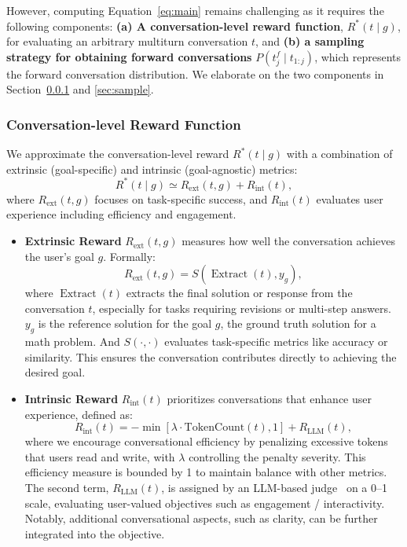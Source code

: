 However, computing Equation~\ref{eq:main} remains challenging as it requires the following components:
\textbf{(a) A conversation-level reward function}, $R^*(t \mid g)$, for evaluating an arbitrary multiturn conversation $t$, and  
\textbf{(b) a sampling strategy for obtaining forward conversations} $P(t_j^f \mid t_{1:j})$, which represents the forward conversation distribution.  We elaborate on the two components in Section~\ref{sec:conv} and \ref{sec:sample}.

\subsubsection{Conversation-level Reward Function}
\label{sec:conv}
We approximate the conversation-level reward $R^*(t \mid g)$ with a combination of extrinsic (goal-specific) and intrinsic (goal-agnostic) metrics:
\begin{equation}
R^*(t \mid g) \simeq R_{\text{ext}}(t, g) + R_{\text{int}}(t),
\end{equation}
where $R_{\text{ext}}(t, g)$ focuses on task-specific success, and $R_{\text{int}}(t)$ evaluates user experience including efficiency and engagement. 


\begin{itemize}
    \item \textbf{Extrinsic Reward} $R_{\text{ext}}(t, g)$ measures how well the conversation achieves the user’s goal $g$. Formally:
    \vspace{-2pt}
    \begin{equation}
        R_{\text{ext}}(t, g) = S(\operatorname{Extract}(t), y_g),
    \end{equation}
    where $\operatorname{Extract}(t)$ extracts the final solution or response from the conversation $t$, especially for tasks requiring revisions or multi-step answers. $y_g$ is the reference solution for the goal $g$, \eg the ground truth solution for a math problem. And $S(\cdot, \cdot)$ evaluates task-specific metrics like accuracy or similarity. This ensures the conversation contributes directly to achieving the desired goal.
    \vspace{0.5pt}
    \item \textbf{Intrinsic Reward} $R_{\text{int}}(t)$ prioritizes conversations that enhance user experience, defined as:
    \vspace{-2pt}
    \begin{equation}
        R_{\text{int}}(t) = - \min[\lambda \cdot \text{TokenCount}(t), 1] + R_{\text{LLM}}(t),
        \label{eq:intrinsic}
    \end{equation}
    where we encourage conversational efficiency by penalizing excessive tokens that users read and write, with $\lambda$ controlling the penalty severity. This efficiency measure is bounded by 1 to maintain balance with other metrics. The second term, $R_{\text{LLM}}(t)$, is assigned by an LLM-based judge~\citep{llm_as_judge} on a 0–1 scale, evaluating user-valued objectives such as engagement / interactivity. Notably, additional conversational aspects, such as clarity, can be further integrated into the objective.
\end{itemize}

